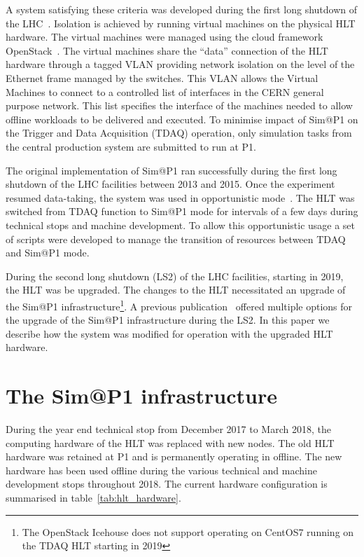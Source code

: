 \documentclass{webofc}
\begin{document}
A system satisfying these criteria was developed during the first long shutdown
of the LHC~\cite{Ballestrero:2015ypa}. Isolation is achieved by running virtual
machines on the physical HLT hardware. The virtual machines were managed using
the cloud framework OpenStack~\cite{openstack}. The virtual machines share the
``data'' connection of the HLT hardware through a tagged VLAN providing network
isolation on the level of the Ethernet frame managed by the switches. This VLAN
allows the Virtual Machines to connect to a controlled list of interfaces in the
CERN general purpose network. This list specifies the interface of the machines
needed to allow offline workloads to be delivered and executed. To minimise
impact of Sim@P1 on the Trigger and Data Acquisition (TDAQ) operation, only
simulation tasks from the central production system are submitted to run at P1.

The original implementation of Sim@P1 ran successfully during the first long
shutdown of the LHC facilities between 2013 and 2015. Once the experiment
resumed data-taking, the system was used in opportunistic
mode~\cite{Ballestrero:2017psv}. The HLT was switched from TDAQ function to
Sim@P1 mode for intervals of a few days during technical stops and machine
development. To allow this opportunistic usage a set of scripts were developed
to manage the transition of resources between TDAQ and Sim@P1 mode.

During the second long shutdown (LS2) of the LHC facilities, starting in 2019,
the HLT
was be upgraded. The changes to the HLT necessitated an upgrade of the Sim@P1
infrastructure\footnote{The OpenStack Icehouse does not support operating on
CentOS7 running on the TDAQ HLT starting in 2019}. A previous
publication~\cite{Berghaus:2019wuj} offered multiple options for the upgrade of
the Sim@P1 infrastructure during the LS2. In this paper we describe how the
system was modified for operation with the upgraded HLT hardware.

\section{The Sim@P1 infrastructure}
\label{sec:infra}
During the year end technical stop from December 2017 to March 2018, the
computing hardware of the HLT was replaced with new nodes. The old HLT hardware
was retained at P1 and is permanently operating in offline. The new hardware has
been used offline during the various technical and machine development
stops throughout 2018. The current hardware configuration is summarised in
table~\ref{tab:hlt_hardware}.
\end{document}
